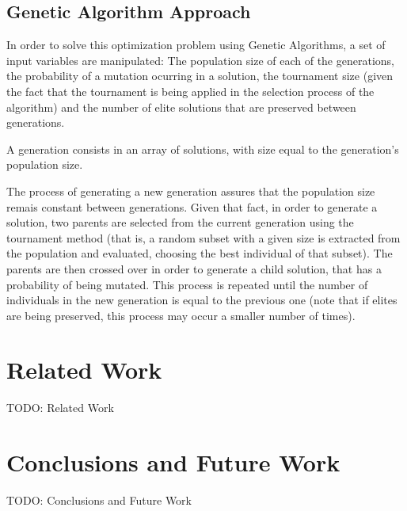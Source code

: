 \documentclass[conference]{IEEEtran}
\begin{document}
\subsection{Genetic Algorithm Approach}

In order to solve this optimization problem using Genetic Algorithms, a set of input variables are manipulated: The population size of each of the generations, the probability of a mutation ocurring in a solution, the tournament size (given the fact that the tournament is being applied in the selection process of the algorithm) and the number of elite solutions that are preserved between generations.

A generation consists in an array of solutions, with size equal to the generation's population size.

The process of generating a new generation assures that the population size remais constant between generations. Given that fact, in order to generate a solution, two parents are selected from the current generation using the tournament method (that is, a random subset with a given size is extracted from the population and evaluated, choosing the best individual of that subset). The parents are then crossed over in order to generate a child solution, that has a probability of being mutated. This process is repeated until the number of individuals in the new generation is equal to the previous one (note that if elites are being preserved, this process may occur a smaller number of times).


\section{Related Work}

TODO: Related Work

\section{Conclusions and Future Work}

TODO: Conclusions and Future Work
\end{document}
